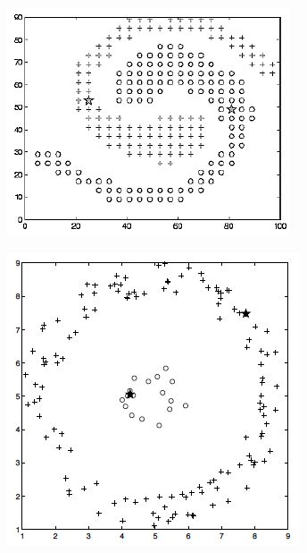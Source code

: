 \documentclass[./some_latex_template.tex]{subfiles}
\begin{document}
\begin{figure}[H]
  \begin{subfigure}[b]{0.5\textwidth}
    \includegraphics[width=\textwidth]{figures/etc_1.png}
  \end{subfigure}
  \quad 
  \begin{subfigure}[b]{0.4\textwidth}
    \includegraphics[width=\textwidth]{figures/etc_2.png}
  \end{subfigure}
\end{figure}
\end{document}
